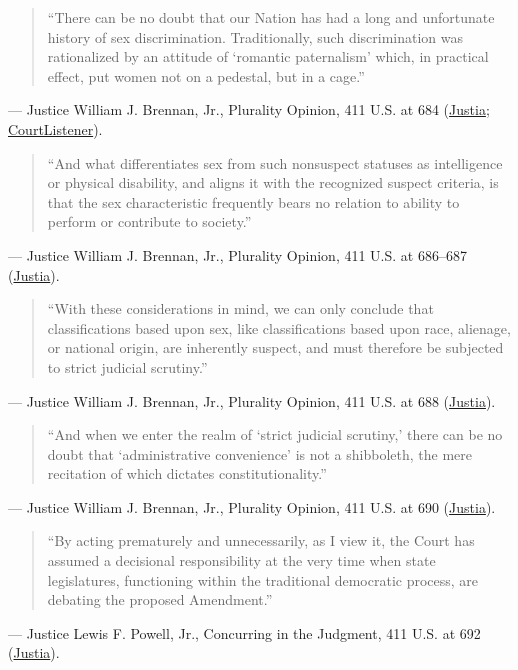 \documentclass[12pt]{article}
\begin{document}
\begin{quote}
``There can be no doubt that our Nation has had a long and unfortunate history of sex discrimination. Traditionally, such discrimination was rationalized by an attitude of `romantic paternalism' which, in practical effect, put women not on a pedestal, but in a cage.''
\end{quote}
\noindent--- Justice William J. Brennan, Jr., Plurality Opinion, 411 U.S. at 684 (\href{https://supreme.justia.com/cases/federal/us/411/677/}{Justia}; \href{https://www.courtlistener.com/opinion/108781/frontiero-v-richardson/}{CourtListener}).

\begin{quote}
``And what differentiates sex from such nonsuspect statuses as intelligence or physical disability, and aligns it with the recognized suspect criteria, is that the sex characteristic frequently bears no relation to ability to perform or contribute to society.''
\end{quote}
\noindent--- Justice William J. Brennan, Jr., Plurality Opinion, 411 U.S. at 686--687 (\href{https://supreme.justia.com/cases/federal/us/411/677/}{Justia}).

\begin{quote}
``With these considerations in mind, we can only conclude that classifications based upon sex, like classifications based upon race, alienage, or national origin, are inherently suspect, and must therefore be subjected to strict judicial scrutiny.''
\end{quote}
\noindent--- Justice William J. Brennan, Jr., Plurality Opinion, 411 U.S. at 688 (\href{https://supreme.justia.com/cases/federal/us/411/677/}{Justia}).

\begin{quote}
``And when we enter the realm of `strict judicial scrutiny,' there can be no doubt that `administrative convenience' is not a shibboleth, the mere recitation of which dictates constitutionality.''
\end{quote}
\noindent--- Justice William J. Brennan, Jr., Plurality Opinion, 411 U.S. at 690 (\href{https://supreme.justia.com/cases/federal/us/411/677/}{Justia}).

\begin{quote}
``By acting prematurely and unnecessarily, as I view it, the Court has assumed a decisional responsibility at the very time when state legislatures, functioning within the traditional democratic process, are debating the proposed Amendment.''
\end{quote}
\noindent--- Justice Lewis F. Powell, Jr., Concurring in the Judgment, 411 U.S. at 692 (\href{https://supreme.justia.com/cases/federal/us/411/677/}{Justia}).
\end{document}
